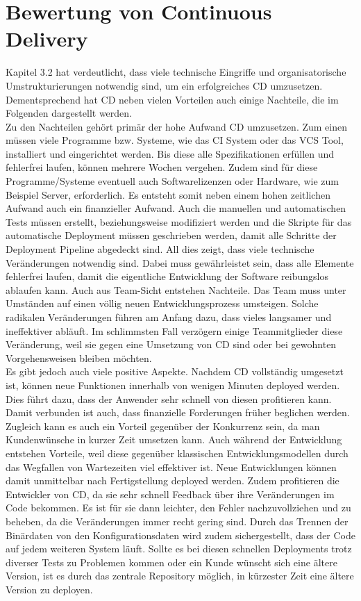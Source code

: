 \section{Bewertung von Continuous Delivery}
Kapitel 3.2 hat verdeutlicht, dass viele technische Eingriffe und organisatorische Umstrukturierungen notwendig sind, um ein erfolgreiches \acs{CD} umzusetzen. Dementsprechend hat \acs{CD} neben vielen Vorteilen auch einige Nachteile, die im Folgenden dargestellt werden. \\
Zu den Nachteilen gehört primär der hohe Aufwand \acs{CD} umzusetzen. Zum einen müssen viele Programme bzw. Systeme, wie das \acs{CI} System oder das \acs{VCS}  Tool, installiert und eingerichtet werden. Bis diese alle Spezifikationen erfüllen und fehlerfrei laufen, können mehrere Wochen vergehen. Zudem sind für diese Programme/Systeme eventuell auch  Softwarelizenzen oder Hardware, wie zum Beispiel Server, erforderlich. Es entsteht somit neben einem hohen zeitlichen Aufwand auch ein finanzieller Aufwand. Auch die manuellen und automatischen Tests müssen erstellt, beziehungsweise modifiziert werden und die Skripte für das automatische Deployment müssen geschrieben werden, damit alle Schritte der Deployment Pipeline abgedeckt sind. All dies zeigt, dass viele technische Veränderungen notwendig sind. Dabei muss gewährleistet sein, dass alle Elemente fehlerfrei laufen, damit die eigentliche Entwicklung der Software reibungslos ablaufen kann. Auch aus Team-Sicht entstehen Nachteile. Das Team muss unter Umständen auf einen völlig neuen Entwicklungsprozess umsteigen. Solche radikalen Veränderungen führen am Anfang dazu, dass vieles langsamer und ineffektiver abläuft. Im schlimmsten Fall verzögern einige Teammitglieder diese Veränderung, weil sie gegen eine Umsetzung von \acs{CD} sind oder bei gewohnten Vorgehensweisen bleiben möchten. \\
Es gibt jedoch auch viele positive Aspekte. Nachdem \acs{CD} vollständig umgesetzt ist, können neue Funktionen innerhalb von wenigen Minuten deployed werden. Dies führt dazu, dass der Anwender sehr schnell von diesen profitieren kann. Damit verbunden ist auch, dass finanzielle Forderungen früher beglichen werden. Zugleich kann es auch ein Vorteil gegenüber der Konkurrenz sein, da man Kundenwünsche in kurzer Zeit umsetzen kann. Auch während der Entwicklung entstehen Vorteile, weil diese gegenüber klassischen Entwicklungsmodellen durch das Wegfallen von Wartezeiten viel effektiver ist. Neue Entwicklungen können damit unmittelbar nach Fertigstellung deployed werden. Zudem profitieren die Entwickler von \acs{CD}, da sie sehr schnell Feedback über ihre Veränderungen im Code bekommen. Es ist für sie dann leichter, den Fehler nachzuvollziehen und zu beheben, da die Veränderungen immer recht gering sind. Durch das Trennen der Binärdaten von den Konfigurationsdaten  wird zudem sichergestellt, dass der Code auf jedem weiteren System läuft. Sollte es bei diesen schnellen Deployments trotz diverser Tests zu Problemen kommen oder ein Kunde wünscht sich eine ältere Version, ist es durch das zentrale Repository möglich, in kürzester Zeit eine ältere Version zu deployen. \\
